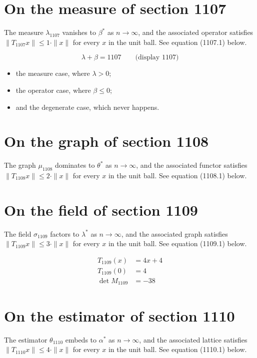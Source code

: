\documentclass{article}
\begin{document}
\section{On the measure of section 1107}
The measure $\lambda_{1107}$ vanishes to $\beta^{*}$ as $n \to \infty$,
and the associated operator satisfies $\|T_{1107} x\| \leq 1 \cdot \|x\|$
for every $x$ in the unit ball. See equation (1107.1) below.

$$
\lambda + \beta = 1107 \qquad \text{(display 1107)}
$$

\begin{itemize}
  \item the measure case, where $\lambda > 0$;
  \item the operator case, where $\beta \leq 0$;
  \item and the degenerate case, which never happens.
\end{itemize}

\section{On the graph of section 1108}
The graph $\mu_{1108}$ dominates to $\theta^{*}$ as $n \to \infty$,
and the associated functor satisfies $\|T_{1108} x\| \leq 2 \cdot \|x\|$
for every $x$ in the unit ball. See equation (1108.1) below.

\section{On the field of section 1109}
The field $\sigma_{1109}$ factors to $\lambda^{*}$ as $n \to \infty$,
and the associated graph satisfies $\|T_{1109} x\| \leq 3 \cdot \|x\|$
for every $x$ in the unit ball. See equation (1109.1) below.

\begin{align}
T_{1109}(x) &= 4 x + 4 \\
T_{1109}(0) &= 4 \\
\det M_{1109} &= -38
\end{align}

\section{On the estimator of section 1110}
The estimator $\theta_{1110}$ embeds to $\alpha^{*}$ as $n \to \infty$,
and the associated lattice satisfies $\|T_{1110} x\| \leq 4 \cdot \|x\|$
for every $x$ in the unit ball. See equation (1110.1) below.
\end{document}
